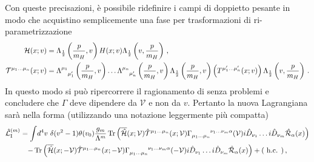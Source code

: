 \documentclass{article}
\newcommand{\adj}[1]{\overline{#1}}
\DeclareMathOperator{\tr}{Tr}
\begin{document}
Con queste precisazioni, è possibile ridefinire i campi di doppietto pesante in modo che acquistino semplicemente una fase per trasformazioni di ri\hyp{}parametrizzazione
\begin{align}
  \mathcal{H}(x; v) &= \Lambda_{\frac{1}{2}} \left(\frac{p}{m_H}, v\right) H(x; v) \Lambda_{\frac{1}{2}} \left(v, \frac{p}{m_H}\right) \, , \\ 
  \mathcal{T}^{\mu_1 \dots \mu_n}(x; v) &= \Lambda\indices{^{\mu_1}_{\mu'_1}}\left(\frac{p}{m_H}, v\right) \dots \Lambda\indices{^{\mu_n}_{\mu'_n}}\left(\frac{p}{m_H}, v\right)  \Lambda_{\frac{1}{2}} \left(\frac{p}{m_H}, v\right) \left( T^{\mu'_1 \dots \mu'_n}(x; v) \right) \Lambda_{\frac{1}{2}} \left(v, \frac{p}{m_H}\right) \, .
\end{align}
In questo modo si può ripercorrere il ragionamento di \cite{article:Luke_Manohar} senza problemi e concludere che $\Gamma$ deve dipendere da $\mathcal{V}$ e non da $v$. Pertanto la nuova Lagrangiana sarà nella forma (utilizzando una notazione leggermente più compatta)
\begin{multline}
  \hat{\mathcal{L}}^{(m)}_\text{I} = \int \! \mathop{d^4 v} \, \delta(v^2 -1) \theta(v_0) \frac{g_m}{\Lambda^m} \tr \left( \adj{\hat{\mathcal{H}}}(x; \mathcal{V}) \hat{\mathcal{T}}^{\mu_1 \dots \mu_n}(x; \mathcal{V}) \Gamma\indices{_{\mu_1 \dots \mu_n}^{\nu_1 \dots \nu_m \alpha}}(\mathcal{V}) i \hat{D}_{\nu_1} \dots i \hat{D}_{\nu_m} \hat{\mathcal{R}}_\alpha(x) \right) \\ - \tr \left( \adj{\hat{\mathcal{H}}}(x; -\mathcal{V}) \hat{\mathcal{T}}^{\mu_1 \dots \mu_n}(x; -\mathcal{V}) \Gamma\indices{_{\mu_1 \dots \mu_n}^{\nu_1 \dots \nu_m \alpha}}(-\mathcal{V}) i \hat{D}_{\nu_1} \dots i \hat{D}_{\nu_m} \hat{\mathcal{R}}_\alpha(x) \right)  + (\text{ h.c. }) \, ,
\end{multline}
\end{document}
